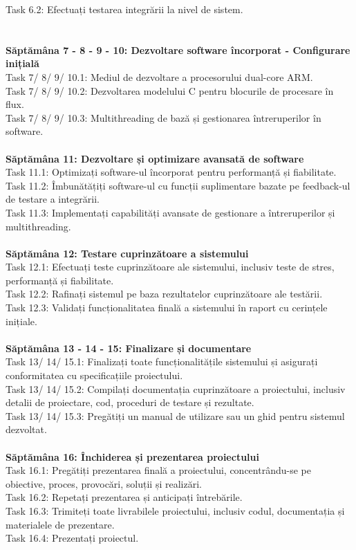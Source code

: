 \documentclass[12pt]{article}
\begin{document}
Task 6.2: Efectuați testarea integrării la nivel de sistem.\\\\\\
\textbf{Săptămâna 7 - 8 - 9 - 10: Dezvoltare software încorporat - Configurare inițială}\\
Task 7/ 8/ 9/ 10.1: Mediul de dezvoltare a procesorului dual-core ARM.\\
Task 7/ 8/ 9/ 10.2: Dezvoltarea modelului C pentru blocurile de procesare în flux.\\
Task 7/ 8/ 9/ 10.3: Multithreading de bază și gestionarea întreruperilor în software.\\\\
\textbf{Săptămâna 11: Dezvoltare și optimizare avansată de software}\\
Task 11.1: Optimizați software-ul încorporat pentru performanță și fiabilitate.\\
Task 11.2: Îmbunătățiți software-ul cu funcții suplimentare bazate pe feedback-ul de testare a integrării.\\
Task 11.3: Implementați capabilități avansate de gestionare a întreruperilor și multithreading.\\\\
\textbf{Săptămâna 12: Testare cuprinzătoare a sistemului}\\
Task 12.1: Efectuați teste cuprinzătoare ale sistemului, inclusiv teste de stres, performanță și fiabilitate.\\
Task 12.2: Rafinați sistemul pe baza rezultatelor cuprinzătoare ale testării.\\
Task 12.3: Validați funcționalitatea finală a sistemului în raport cu cerințele inițiale.\\\\
\textbf{Săptămâna 13 - 14 - 15: Finalizare și documentare}\\
Task 13/ 14/ 15.1: Finalizați toate funcționalitățile sistemului și asigurați conformitatea cu specificațiile proiectului.\\
Task 13/ 14/ 15.2: Compilați documentația cuprinzătoare a proiectului, inclusiv detalii de proiectare, cod, proceduri de testare și rezultate.\\
Task 13/ 14/ 15.3: Pregătiți un manual de utilizare sau un ghid pentru sistemul dezvoltat.\\\\
\textbf{Săptămâna 16: Închiderea și prezentarea proiectului}\\
Task 16.1: Pregătiți prezentarea finală a proiectului, concentrându-se pe obiective, proces, provocări, soluții și realizări.\\
Task 16.2: Repetați prezentarea și anticipați întrebările.\\
Task 16.3: Trimiteți toate livrabilele proiectului, inclusiv codul, documentația și materialele de prezentare.\\
Task 16.4: Prezentați proiectul.\\\\
\end{document}
